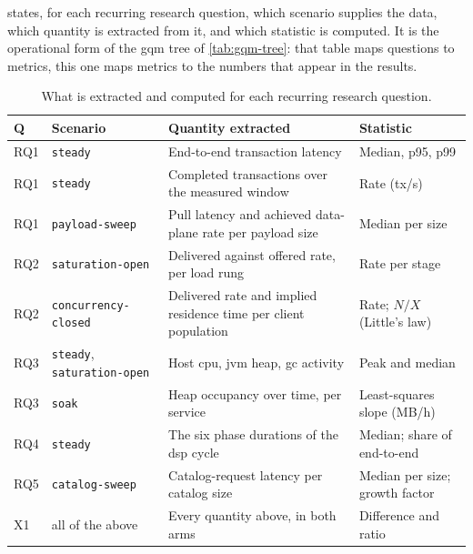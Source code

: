 \pagebreak

 states, for each recurring research question, which scenario supplies the data, which quantity is extracted from it, and which statistic is computed. It is the operational form of the \gls{gqm} tree of \cref{tab:gqm-tree}: that table maps questions to metrics, this one maps metrics to the numbers that appear in the results.

\begin{table}[H]
    \centering
    \small
    \setlength{\tabcolsep}{4pt}
    \begin{tabularx}{\textwidth}{@{}l >{\raggedright\arraybackslash}p{2.4cm} X >{\raggedright\arraybackslash}p{3.2cm}@{}}
        \toprule
        \textbf{Q} & \textbf{Scenario} & \textbf{Quantity extracted} & \textbf{Statistic} \\
        \midrule
        RQ1 & \texttt{steady} & End-to-end transaction latency & Median, p95, p99 \\
        RQ1 & \texttt{steady} & Completed transactions over the measured window & Rate (tx/s) \\
        RQ1 & \texttt{payload-\allowbreak sweep} & Pull latency and achieved data-plane rate per payload size & Median per size \\
        \addlinespace
        RQ2 & \texttt{saturation-\allowbreak open} & Delivered against offered rate, per load rung & Rate per stage \\
        RQ2 & \texttt{concurrency-\allowbreak closed} & Delivered rate and implied residence time per client population & Rate; $N/X$ (Little's law) \\
        \addlinespace
        RQ3 & \texttt{steady}, \texttt{saturation-\allowbreak open} & Host \gls{cpu}, \gls{jvm} heap, \gls{gc} activity & Peak and median \\
        RQ3 & \texttt{soak} & Heap occupancy over time, per service & Least-squares slope (MB/h) \\
        \addlinespace
        RQ4 & \texttt{steady} & The six phase durations of the \gls{dsp} cycle & Median; share of end-to-end \\
        \addlinespace
        RQ5 & \texttt{catalog-\allowbreak sweep} & Catalog-request latency per catalog size & Median per size; growth factor \\
        \addlinespace
        X1 & all of the above & Every quantity above, in both arms & Difference and ratio \\
        \bottomrule
    \end{tabularx}
    \caption[Analysis performed per research question]{What is extracted and computed for each recurring research question.}
    \label{tab:analysis-per-rq}
\end{table}

